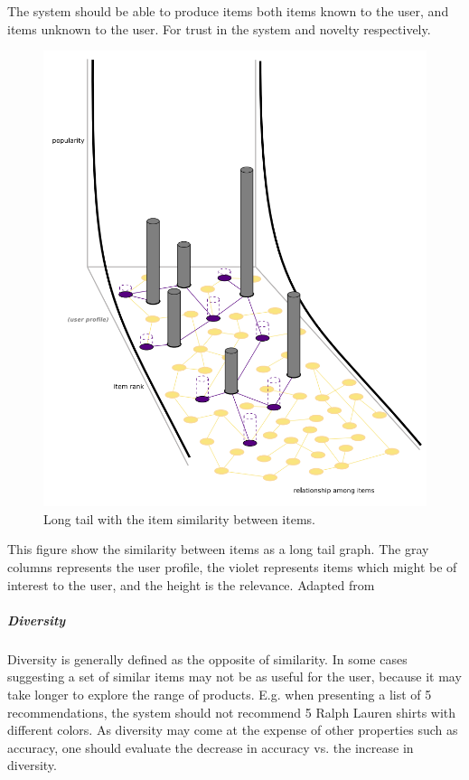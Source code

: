 The system should be able to produce items both items known to the user, and
items unknown to the user.  For trust in the system and novelty respectively.


\begin{figure}[H]
    \centering
    \includegraphics[scale=0.4]{image/longtailNoveltyFig.png}
    \caption{Long tail with the item similarity between items. }
    \label{figure:longtailNovelty}
\end{figure}


This figure show the similarity between items as a long tail graph. The gray
columns represents the user profile, the violet represents items which might be
of interest to the user, and the height is the relevance. Adapted
from~\cite{celma2008}

\subparagraph{Diversity}
Diversity is generally defined as the opposite of similarity. In some cases suggesting a set of similar items may not be as useful for the user, because it may take longer to explore the range of products. E.g. when presenting a list of 5 recommendations, the system should not recommend 5 Ralph Lauren shirts with different colors. As diversity may come at the expense of other properties such as accuracy, one should evaluate the decrease in accuracy vs. the increase in diversity.

